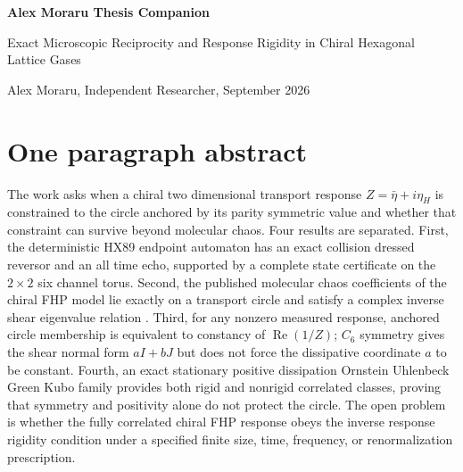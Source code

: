 \documentclass[11pt,a4paper]{article}
\newcommand{\RePart}{\operatorname{Re}}
\begin{document}
\begin{center}
{\LARGE\bfseries Alex Moraru Thesis Companion\par}
\vspace{4mm}
{\Large Exact Microscopic Reciprocity and Response Rigidity in Chiral Hexagonal Lattice Gases\par}
\vspace{4mm}
{\large Alex Moraru, Independent Researcher, September 2026\par}
\end{center}

\section*{One paragraph abstract}
The work asks when a chiral two dimensional transport response $Z=\bar\eta+i\eta_H$ is constrained to the circle anchored by its parity symmetric value and whether that constraint can survive beyond molecular chaos. Four results are separated. First, the deterministic HX89 endpoint automaton has an exact collision dressed reversor and an all time echo, supported by a complete \HXGlobalStates{} state certificate on the $2\times2$ six channel torus. Second, the published molecular chaos coefficients of the chiral FHP model lie exactly on a transport circle and satisfy a complex inverse shear eigenvalue relation \cite{Allocca2026}. Third, for any nonzero measured response, anchored circle membership is equivalent to constancy of $\RePart(1/Z)$; $C_6$ symmetry gives the shear normal form $aI+bJ$ but does not force the dissipative coordinate $a$ to be constant. Fourth, an exact stationary positive dissipation Ornstein Uhlenbeck Green Kubo family provides both rigid and nonrigid correlated classes, proving that symmetry and positivity alone do not protect the circle. The open problem is whether the fully correlated chiral FHP response obeys the inverse response rigidity condition under a specified finite size, time, frequency, or renormalization prescription.
\end{document}
